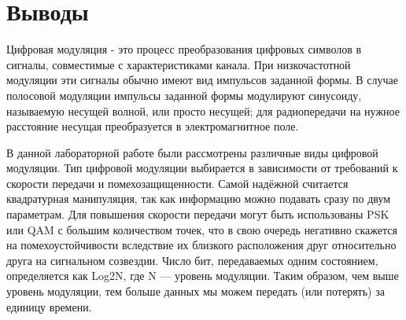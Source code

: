 \documentclass[a4paper,14pt]{extarticle}
\begin{document}
\section{Выводы}
Цифровая модуляция - это процесс преобразования цифровых символов в сигналы, совместимые с характеристиками канала. При низкочастотной модуляции эти сигналы обычно имеют вид импульсов заданной формы. В случае полосовой модуляции импульсы заданной формы модулируют синусоиду, называемую несущей волной, или просто несущей; для радиопередачи на нужное расстояние несущая преобразуется в электромагнитное поле.

В данной лабораторной работе были рассмотрены различные виды цифровой модуляции. Тип цифровой модуляции выбирается в зависимости от требований к скорости передачи и помехозащищенности. Самой надёжной считается квадратурная манипуляция, так как информацию можно подавать сразу по двум параметрам. Для повышения скорости передачи могут быть использованы PSK или QAM с большим количеством точек, что в свою очередь негативно скажется на помехоустойчивости вследствие их близкого расположения друг относительно друга на сигнальном созвездии.
Число бит, передаваемых одним состоянием, определяется как Log2N, где N — уровень модуляции. Таким образом, чем выше уровень модуляции, тем больше данных мы можем передать (или потерять) за единицу времени. 
\end{document}
